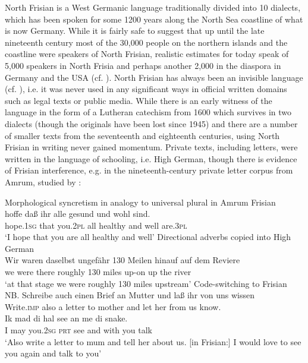 \documentclass[output=paper]{langsci/langscibook}
\begin{document}
North Frisian is a West Germanic language traditionally divided into 10 dialects, which has been spoken for some 1200 years along the North Sea coastline of what is now Germany. While it is fairly safe to suggest that up until the late nineteenth century most of the 30,000 people on the northern islands and the coastline were speakers of North Frisian, realistic estimates for today speak of 5,000 speakers in North Frisia and perhaps another 2,000 in the diaspora in Germany and the USA (cf. \citealt{Arhammar2008}). North Frisian has always been an invisible language (cf. \citealt{HavingaLanger2016}), i.e. it was never used in any significant ways in official written domains such as legal texts or public media. While there is an early witness of the language in the form of a Lutheran catechism from 1600 which survives in two dialects (though the originals have been lost since 1945) and there are a number of smaller texts from the seventeenth and eighteenth centuries, using North Frisian in writing never gained momentum. Private texts, including letters, were written in the language of schooling, i.e. High German, though there is evidence of Frisian interference, e.g. in the nineteenth-century private letter corpus from Amrum, studied by \citet{Jacobs-Owen2017}: 

\ea
\label{ex:gregersen:1}
 Morphological syncretism in analogy to universal plural in Amrum Frisian \\
	\gll hoffe daß ihr alle gesund und wohl sind.\\
     hope.\textsc{1sg} that you.\textsc{2pl} all healthy and well are.\textsc{3pl}\\
\glt ‘I hope that you are all healthy and well’ \citep[54]{Jacobs-Owen2017}
\ex
\label{ex:gregersen:2}
 {Directional adverbs copied into High German} \\
\gll Wir waren daselbst ungefähr 130 Meilen hinauf auf dem Reviere  \\
     we were there roughly 130 miles up-on up the river\\
\glt ‘at that stage we were roughly 130 miles upstream’ \citep[71]{Jacobs-Owen2017}
\ex\label{ex:gregersen:3}
 {Code-switching to Frisian} \\
\gll NB. Schreibe auch einen Brief an Mutter und laß ihr von uns wissen\\
{ } Write.\textsc{imp} also a letter to mother and let her from us know. \\

\gll Ik mad di hal see an me di snake. \\
     I may you.\textsc{2sg} \textsc{prt} see and with you talk\\
\glt ‘Also write a letter to mum and tell her about us. [in Frisian:] I would love to see you again and talk to you’ {\citep[91]{Jacobs-Owen2017}}
\z
\end{document}
